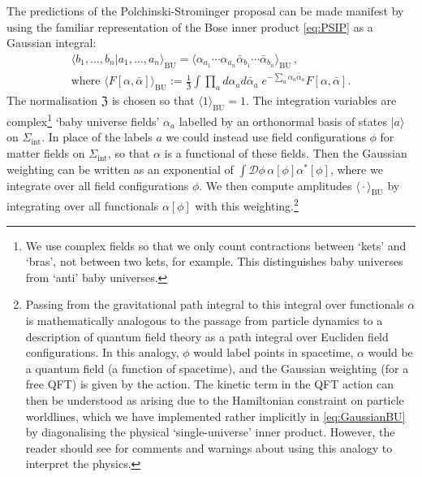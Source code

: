 \documentclass[letterpaper,12pt]{article}
\begin{document}
The predictions of the Polchinski-Strominger proposal can be made manifest by using the familiar representation of the Bose inner product \eqref{eq:PSIP} as a Gaussian integral:
\begin{gather}
	\langle b_1,\ldots,b_n|a_1,\ldots,a_n \rangle_{\mathrm{BU}} =\Big\langle \alpha_{a_1}\cdots \alpha_{a_n} \bar{\alpha}_{b_1}\cdots \bar{\alpha}_{b_n}\Big\rangle_{\mathrm{BU}} \, , \\
	\text{where } \Big\langle F[\alpha,\bar{\alpha}] \Big\rangle_{\mathrm{BU}} := \frac{1}{\mathfrak{Z}}\int \prod_{a} d\alpha_a d\bar{\alpha}_a \; e^{-\sum_a \alpha_a \bar{\alpha}_a}  F[\alpha,\bar{\alpha}]. \label{eq:GaussianBU}
\end{gather}
The normalisation $\mathfrak{Z}$ is chosen so that $\big\langle 1 \big\rangle_{\mathrm{BU}} =1 $. The integration variables are complex\footnote{We use complex fields so that we only count contractions between `kets' and `bras', not between two kets, for example. This distinguishes baby universes from `anti' baby universes.} `baby universe fields' $\alpha_a$ labelled by an orthonormal basis of states $|a\rangle$ on $\Sigma_\mathrm{int}$. In place of the labels $a$ we could instead use field configurations $\phi$ for matter fields on $\Sigma_\mathrm{int}$, so that $\alpha$ is a functional of these fields. Then the Gaussian weighting can be written as an exponential of  $\int \mathcal{D}\phi \, \alpha[\phi]\alpha^*[\phi]$, where we integrate over all field configurations $\phi$. We then compute amplitudes $\big\langle \cdot \big\rangle_{\mathrm{BU}}$ by integrating over all functionals $\alpha[\phi]$ with this weighting.\footnote{Passing from the gravitational path integral to this integral over functionals $\alpha$ is mathematically analogous to the passage from particle dynamics to a description of quantum field theory as a path integral over Eucliden field configurations.  In this analogy, $\phi$ would label points in spacetime, $\alpha$ would be a quantum field (a function of spacetime), and the Gaussian weighting (for a free QFT) is given by the action. The kinetic term in the QFT action can then be understood as arising due to the Hamiltonian constraint on particle worldlines, which we have implemented rather implicitly in \eqref{eq:GaussianBU} by diagonalising the physical `single-universe' inner product.
However, the reader should see \cite{CMMR} for comments and warnings about using this analogy to interpret the physics.}
\end{document}
